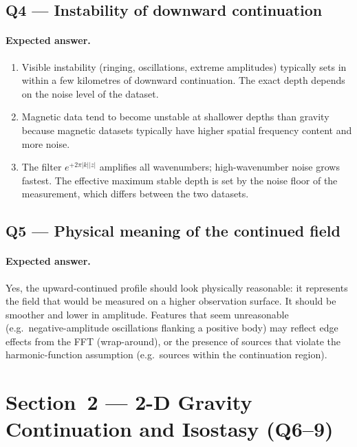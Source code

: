\documentclass[11pt]{article}
\begin{document}
\subsection*{Q4 — Instability of downward continuation}

\paragraph{Expected answer.}
\begin{enumerate}[label=\alph*.]
  \item Visible instability (ringing, oscillations, extreme amplitudes) typically
        sets in within a few kilometres of downward continuation.  The exact
        depth depends on the noise level of the dataset.
  \item Magnetic data tend to become unstable at shallower depths than gravity
        because magnetic datasets typically have higher spatial frequency content
        and more noise.
  \item The filter $e^{+2\pi|k||z|}$ amplifies all wavenumbers; high-wavenumber
        noise grows fastest.  The effective maximum stable depth is set by the
        noise floor of the measurement, which differs between the two datasets.
\end{enumerate}

\subsection*{Q5 — Physical meaning of the continued field}

\paragraph{Expected answer.}
Yes, the upward-continued profile should look physically reasonable: it represents
the field that would be measured on a higher observation surface.  It should be
smoother and lower in amplitude.  Features that seem unreasonable (e.g.\
negative-amplitude oscillations flanking a positive body) may reflect edge effects
from the FFT (wrap-around), or the presence of sources that violate the
harmonic-function assumption (e.g.\ sources within the continuation region).

\section{Section~2 — 2-D Gravity Continuation and Isostasy (Q6--9)}
\end{document}

